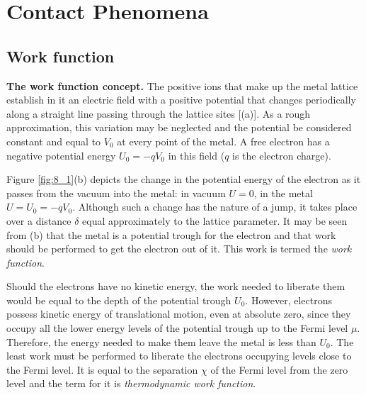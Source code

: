

\chapter[Contact Phenomena]{Contact Phenomena}\label{chap:8}

\section{Work function}\label{sec:73}

\textbf{The work function concept.} The positive ions that make up the metal lattice establish in it an electric field with a positive potential that changes periodically along a straight line passing through the lattice sites [(a)]. As a rough approximation, this variation may be neglected and the potential be considered constant and equal to $V_0$ at every point of the metal. A free electron has a negative potential energy $U_0=-qV_0$ in this field ($q$ is the electron charge).

Figure \ref{fig:8_1}(b) depicts the change in the potential energy of the electron as it passes from the vacuum into the metal: in vacuum $U=0$, in the metal $U=U_0=-qV_0$. Although such a change has the nature of a jump, it takes place over a distance $\delta$ equal approximately to the lattice parameter. It may be seen from (b) that the metal is a potential trough for the electron and that work should be performed to get the electron out of it. This work is termed the \textit{work function}.

Should the electrons have no kinetic energy, the work needed to liberate them would be equal to the depth of the potential trough $U_0$. However, electrons possess kinetic energy of translational motion, even at absolute zero, since they occupy all the lower energy levels of the potential trough up to the Fermi level $\mu$. Therefore, the energy needed to make them leave the metal is less than $U_0$. The least work must be performed to liberate the electrons occupying levels close to the Fermi level. It is equal to the separation $\chi$ of the Fermi level from the zero level and the term for it is \textit{thermodynamic work function}.

